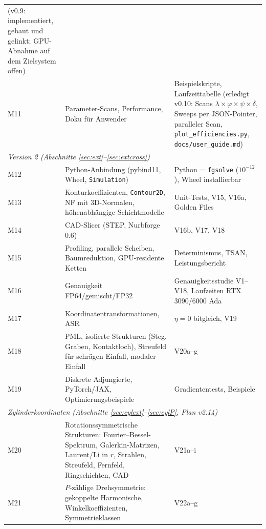 \begin{longtable}{p{1.0cm}p{6.6cm}p{6.6cm}}
  (v0.9: implementiert, gebaut und gelinkt; GPU-Abnahme auf dem Zielsystem offen) \\
M11 & Parameter-Scans, Performance, Doku für Anwender & Beispielskripte, Laufzeittabelle
  (erledigt v0.10: Scans $\lambda\times\varphi\times\psi\times\delta$, Sweeps per JSON-Pointer, paralleler Scan,
  \verb|plot_efficiencies.py|, \verb|docs/user_guide.md|) \\
\midrule
\multicolumn{3}{l}{\emph{Version 2 (Abschnitte \ref{sec:ext}--\ref{sec:extcross})}}\\
M12 & Python-Anbindung (pybind11, Wheel, \verb|Simulation|) & Python = \verb|fgsolve| ($10^{-12}$), Wheel installierbar \\
M13 & Konturkoeffizienten, \verb|Contour2D|, NF mit 3D-Normalen, höhenabhängige Schichtmodelle & Unit-Tests, V15, V16a, Golden Files \\
M14 & CAD-Slicer (STEP, Nurbforge 0.6) & V16b, V17, V18 \\
M15 & Profiling, parallele Scheiben, Baumreduktion, GPU-residente Ketten & Determinismus, TSAN, Leistungsbericht \\
M16 & Genauigkeit FP64/gemischt/FP32 & Genauigkeitsstudie V1--V18, Laufzeiten RTX 3090/6000 Ada \\
M17 & Koordinatentransformationen, ASR & $\eta=0$ bitgleich, V19 \\
M18 & PML, isolierte Strukturen (Steg, Graben, Kontaktloch), Streufeld für schrägen Einfall, modaler Einfall & V20a--g \\
M19 & Diskrete Adjungierte, PyTorch/JAX, Optimierungsbeispiele & Gradiententests, Beispiele \\
\midrule
\multicolumn{3}{l}{\emph{Zylinderkoordinaten (Abschnitte \ref{sec:cylext}--\ref{sec:cylP}, Plan v2.14)}}\\
M20 & Rotationssymmetrische Strukturen: Fourier--Bessel-Spektrum, Galerkin-Matrizen, Laurent/Li in $r$, Strahlen, Streufeld, Fernfeld, Ringschichten, CAD & V21a--i \\
M21 & $P$-zählige Drehsymmetrie: gekoppelte Harmonische, Winkelkoeffizienten, Symmetrieklassen & V22a--g \\
\bottomrule
\end{longtable}

